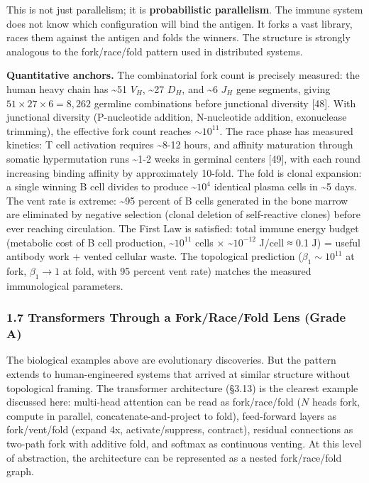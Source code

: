 \documentclass[
  11pt,
]{article}
\begin{document}
This is not just parallelism; it is \textbf{probabilistic parallelism}.
The immune system does not know which configuration will bind the
antigen. It forks a vast library, races them against the antigen and
folds the winners. The structure is strongly analogous to the
fork/race/fold pattern used in distributed systems.

\textbf{Quantitative anchors.} The combinatorial fork count is precisely
measured: the human heavy chain has \textasciitilde51 \(V_H\),
\textasciitilde27 \(D_H\), and \textasciitilde6 \(J_H\) gene segments,
giving \(51 \times 27 \times 6 = 8{,}262\) germline combinations before
junctional diversity {[}48{]}. With junctional diversity (P-nucleotide
addition, N-nucleotide addition, exonuclease trimming), the effective
fork count reaches \(\sim 10^{11}\). The race phase has measured
kinetics: T cell activation requires \textasciitilde8-12 hours, and
affinity maturation through somatic hypermutation runs
\textasciitilde1-2 weeks in germinal centers {[}49{]}, with each round
increasing binding affinity by approximately 10-fold. The fold is clonal
expansion: a single winning B cell divides to produce
\textasciitilde{}\(10^4\) identical plasma cells in \textasciitilde5
days. The vent rate is extreme: \textasciitilde95 percent of B cells
generated in the bone marrow are eliminated by negative selection
(clonal deletion of self-reactive clones) before ever reaching
circulation. The First Law is satisfied: total immune energy budget
(metabolic cost of B cell production, \textasciitilde{}\(10^{11}\) cells
× \textasciitilde{}\(10^{-12}\) J/cell ≈ 0.1 J) = useful antibody work +
vented cellular waste. The topological prediction
(\(\beta_1 \sim 10^{11}\) at fork, \(\beta_1 \to 1\) at fold, with 95
percent vent rate) matches the measured immunological parameters.

\subsubsection{1.7 Transformers Through a Fork/Race/Fold Lens (Grade
A)}\label{transformers-through-a-forkracefold-lens-grade-a}

The biological examples above are evolutionary discoveries. But the
pattern extends to human-engineered systems that arrived at similar
structure without topological framing. The transformer architecture
(§3.13) is the clearest example discussed here: multi-head attention can
be read as fork/race/fold (\(N\) heads fork, compute in parallel,
concatenate-and-project to fold), feed-forward layers as fork/vent/fold
(expand 4x, activate/suppress, contract), residual connections as
two-path fork with additive fold, and softmax as continuous venting. At
this level of abstraction, the architecture can be represented as a
nested fork/race/fold graph.
\end{document}
